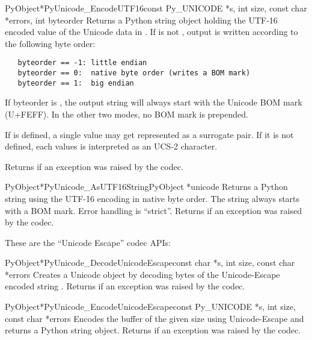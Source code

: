 \begin{cfuncdesc}{PyObject*}{PyUnicode_EncodeUTF16}{const Py_UNICODE *s,
                                               int size,
                                               const char *errors,
                                               int byteorder}
  Returns a Python string object holding the UTF-16 encoded value of
  the Unicode data in .  If  is not ,
  output is written according to the following byte order:

\begin{verbatim}
   byteorder == -1: little endian
   byteorder == 0:  native byte order (writes a BOM mark)
   byteorder == 1:  big endian
\end{verbatim}

  If byteorder is , the output string will always start with
  the Unicode BOM mark (U+FEFF). In the other two modes, no BOM mark
  is prepended.

  If  is defined, a single 
  value may get represented as a surrogate pair. If it is not
  defined, each  values is interpreted as an
  UCS-2 character.

  Returns \NULL{} if an exception was raised by the codec.
\end{cfuncdesc}

\begin{cfuncdesc}{PyObject*}{PyUnicode_AsUTF16String}{PyObject *unicode}
  Returns a Python string using the UTF-16 encoding in native byte
  order. The string always starts with a BOM mark.  Error handling is
  ``strict''.  Returns \NULL{} if an exception was raised by the
  codec.
\end{cfuncdesc}


These are the ``Unicode Escape'' codec APIs:

\begin{cfuncdesc}{PyObject*}{PyUnicode_DecodeUnicodeEscape}{const char *s,
                                               int size,
                                               const char *errors}
  Creates a Unicode object by decoding  bytes of the
  Unicode-Escape encoded string .  Returns \NULL{} if an
  exception was raised by the codec.
\end{cfuncdesc}

\begin{cfuncdesc}{PyObject*}{PyUnicode_EncodeUnicodeEscape}{const Py_UNICODE *s,
                                               int size,
                                               const char *errors}
  Encodes the  buffer of the given size using
  Unicode-Escape and returns a Python string object.  Returns \NULL{}
  if an exception was raised by the codec.
\end{cfuncdesc}


